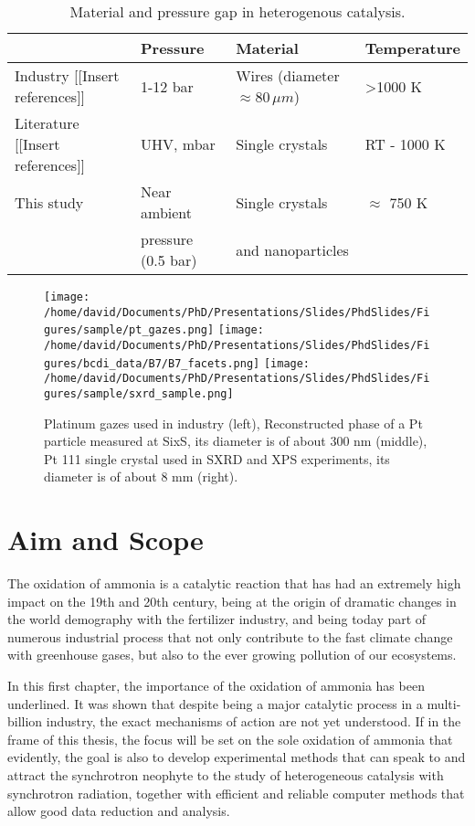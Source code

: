 \begin{table}[!htb]
    \centering
    \begin{tabular}{l|l|l|l}
    \toprule
                & Pressure    & Material       &     Temperature \\
    \midrule
    Industry {\color{DarkOrange}[[Insert references]]}  & 1-12 bar & Wires (diameter $\approx 80 \, \mu m$) & \textgreater 1000 K \\
    \midrule
    Literature {\color{DarkOrange}[[Insert references]]} & UHV, mbar & Single crystals & RT - 1000 K \\ \midrule
    This study & Near ambient    & Single crystals  & $\approx$ 750 K \\
               & pressure (0.5 bar)  & and nanoparticles & \\
    \bottomrule
    \end{tabular}
    \caption{Material and pressure gap in heterogenous catalysis.}
    \label{tab:gap}
\end{table}

\begin{figure}[!htb]
    \centering
    \texttt{[image: /home/david/Documents/PhD/Presentations/Slides/PhdSlides/Figures/sample/pt\_gazes.png]}
    \texttt{[image: /home/david/Documents/PhD/Presentations/Slides/PhdSlides/Figures/bcdi\_data/B7/B7\_facets.png]}
    \texttt{[image: /home/david/Documents/PhD/Presentations/Slides/PhdSlides/Figures/sample/sxrd\_sample.png]}
    \caption{Platinum gazes used in industry (left), Reconstructed phase of a Pt particle measured at SixS, its diameter is of about 300 nm (middle), Pt 111 single crystal used in SXRD and XPS experiments, its diameter is of about 8 mm (right).}
\end{figure}

\section{Aim and Scope}

The oxidation of ammonia is a catalytic reaction that has had an extremely high impact on the 19th and 20th century, being at the origin of dramatic changes in the world demography with the fertilizer industry, and being today part of numerous industrial process that not only contribute to the fast climate change with greenhouse gases, but also to the ever growing pollution of our ecosystems.

In this first chapter, the importance of the oxidation of ammonia has been underlined.
It was shown that despite being a major catalytic process in a multi-billion industry, the exact mechanisms of action are not yet understood.
If in the frame of this thesis, the focus will be set on the sole oxidation of ammonia that evidently, the goal is also to develop experimental methods that can speak to and attract the synchrotron neophyte to the study of heterogeneous catalysis with synchrotron radiation, together with efficient and reliable computer methods that allow good data reduction and analysis.


